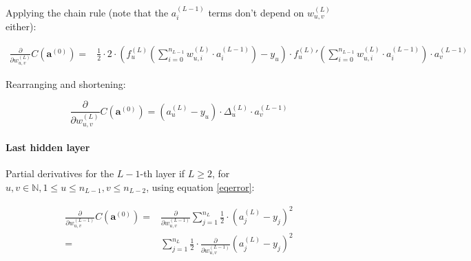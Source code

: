 \documentclass{article}
\begin{document}
          Applying the chain rule (note that the $a_i^{(L-1)}$ terms don't
          depend on $w_{u,v}^{(L)}$ either):

          \begin{equation}
            \begin{split}
              \frac{\partial}{\partial w_{u,v}^{(L)}}
                C \left( \mathbf{a}^{(0)} \right)
                  = & \frac{1}{2}
                      \cdot
                      2
                      \cdot
                      \left(
                          f_{u}^{(L)} \left(
                            \sum_{i=0}^{n_{L-1}}
                              w_{u,i}^{(L)} \cdot a_{i}^{(L-1)}
                          \right)
                          - y_{u}
                        \right)
                      \cdot
                        {f_{u}^{(L)}}' \left(
                          \sum_{i=0}^{n_{L-1}}
                            w_{u,i}^{(L)} \cdot a_{i}^{(L-1)}
                        \right)
                      \cdot
                        a_{v}^{(L-1)}
            \end{split}
          \end{equation}

          Rearranging and shortening:

          \begin{equation}
            \frac{\partial}{\partial w_{u,v}^{(L)}}
              C \left( \mathbf{a}^{(0)} \right)
                = \left( a_{u}^{(L)} - y_{u} \right)
                  \cdot
                  \Delta_u^{(L)}
                  \cdot
                  a_{v}^{(L-1)}
          \end{equation}

        \paragraph{Last hidden layer}

          Partial derivatives for the $L - 1$-th layer if $L \geq 2$,
          for $u, v \in \mathbb{N}, 1 \leq u \leq n_{L-1}, v \leq n_{L-2}$,
          using equation \ref{eqerror}:

          \begin{equation}\label{eqlasthittenpartder0}
            \begin{split}
              \frac{\partial}{\partial w_{u,v}^{(L-1)}}
                C \left( \mathbf{a}^{(0)} \right)
                  = & \frac{\partial}{\partial w_{u,v}^{(L-1)}}
                        \sum_{j=1}^{n_L}
                          \frac{1}{2}
                          \cdot
                          \left( a_j^{(L)} - y_j \right)^2 \\
                  = & \sum_{j=1}^{n_L}
                        \frac{1}{2}
                        \cdot
                        \frac{\partial}{\partial w_{u,v}^{(L-1)}}
                          \left( a_j^{(L)} - y_j \right)^2
            \end{split}
          \end{equation}
\end{document}
